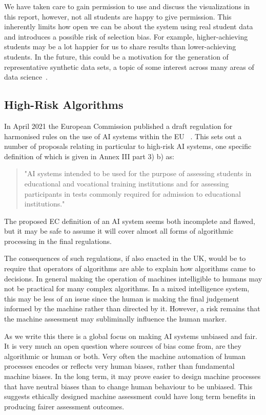 We have taken care to gain permission to use and discuss the visualizations in this report, however, not all students are happy to give permission. This inherently limits how open we can be about the system using real student data and introduces a possible risk of selection bias. For example, higher-achieving students may be a lot happier for us to share results than lower-achieving students. In the future, this could be a motivation for the generation of representative synthetic data sets, a topic of some interest across many areas of data science~\cite{ONS2019}.

\subsection{High-Risk Algorithms}
In April 2021 the European Commission published a draft regulation for harmonised rules on the use of AI systems within the EU~\cite{EC2021} . This sets out a number of proposals relating in particular to high-risk AI systems, one specific definition of which is given in Annex III part 3) b) as:
\begin{quote}
"AI systems intended to be used for the purpose of assessing students in 
educational and vocational training institutions and for assessing participants in 
tests commonly required for admission to educational institutions."
\end{quote}

The proposed EC definition of an AI system seems both incomplete and flawed, but it may be safe to assume it will cover almost all forms of algorithmic processing in the final regulations. 

The consequences of such regulations, if also enacted in the UK, would be to require that operators of algorithms are able to explain how algorithms came to decisions. In general making the operation of machines intelligible to humans may not be practical for many complex algorithms. In a mixed intelligence system, this may be less of an issue since the human is making the final judgement informed by the machine rather than directed by it. However, a risk remains that the machine assessment may subliminally influence the human marker.

As we write this there is a global focus on making AI systems unbiased and fair. It is very much an open question where sources of bias come from, are they algorithmic or human or both. Very often the machine automation of human processes encodes or reflects very human biases, rather than fundamental machine biases. In the long term, it may prove easier to design machine processes that have neutral biases than to change human behaviour to be unbiased. This suggests ethically designed machine assessment could have long term benefits in producing fairer assessment outcomes. 

